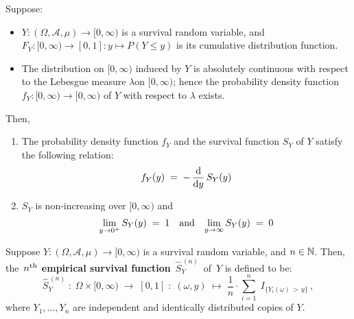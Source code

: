 \vskip 0.5cm
\begin{theorem}
\mbox{}
\vskip 0.1cm
\noindent
Suppose:
\begin{itemize}
\item
	$Y : (\Omega,\mathcal{A},\mu) \longrightarrow [0,\infty)$ is a survival random variable, and
	$F_{Y} : [0,\infty) \longrightarrow [0,1] : y \longmapsto P(Y \leq y)$ is its cumulative distribution function.
\item
	The distribution on $[0,\infty)$ induced by $Y$ is {\color{red}absolutely continuous} with respect to
	the Lebesgue measure $\lambda $on $[0,\infty)$; hence the probability density function
	$f_{Y} : [0,\infty) \longrightarrow [0,\infty)$ of $Y$ with respect to $\lambda$ exists.
\end{itemize}
Then,
\begin{enumerate}
\item
	The probability density function $f_{Y}$ and the survival function $S_{Y}$ of $Y$ satisfy the following relation:
	\begin{equation*}
	f_{Y}(y) \; = \; -\,\dfrac{\textnormal{d}}{\textnormal{d} y}\,S_{Y}(y)
	\end{equation*}
\item
	$S_{Y}$ is non-increasing over $[0,\infty)$ and
	\begin{equation*}
	\underset{y \rightarrow 0^{+}}{\lim}\,S_{Y}(y) \;=\; 1
	\quad\textnormal{and}\quad
	\underset{y \rightarrow \infty}{\lim}\,S_{Y}(y) \;=\; 0 
	\end{equation*}
\end{enumerate}
\end{theorem}


\vskip 0.5cm
\begin{definition}
\mbox{}
\vskip 0.1cm
\noindent
Suppose $Y : (\Omega,\mathcal{A},\mu) \longrightarrow [0,\infty)$ is a survival random variable,
and $n \in \mathbb{N}$.
Then, the \,\textbf{$n^{\textnormal{th}}$ empirical survival function}
\,$\widehat{S}^{\,(n)}_{Y}$\, of \,$Y$ is defined to be:
\begin{equation*}
\widehat{S}^{\,(n)}_{Y} \;:\; \Omega \times [0,\infty) \;\longrightarrow\; [0,1] \;:\;
	(\omega,y) \;\longmapsto\; \dfrac{1}{n}\cdot\overset{n}{\underset{i=1}{\sum}}\;I_{\{Y_{i}(\omega) \,>\, y\}}\,,
\end{equation*}
where $Y_{1}, \ldots, Y_{n}$ are independent and identically distributed copies of $Y$.
\end{definition}


